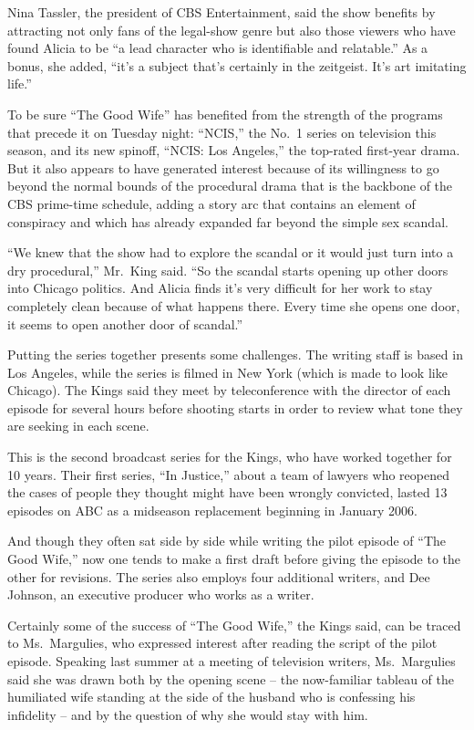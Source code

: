﻿\documentclass[12pt]{article}
\begin{document}
Nina Tassler, the president of CBS Entertainment, said the show benefits by attracting not only fans
of the legal-show genre but also those viewers who have found Alicia to be ``a lead character who is
identifiable and relatable.'' As a bonus, she added, ``it's a subject that's certainly in the
zeitgeist. It's art imitating life.''

To be sure ``The Good Wife'' has benefited from the strength of the programs that precede it on
Tuesday night: ``NCIS,'' the No.~1 series on television this season, and its new spinoff, ``NCIS:
Los Angeles,'' the top-rated first-year drama. But it also appears to have generated interest
because of its willingness to go beyond the normal bounds of the procedural drama that is the
backbone of the CBS prime-time schedule, adding a story arc that contains an element of
conspiracy\cite{conspiracy} and which has already expanded far beyond the simple sex scandal.

``We knew that the show had to explore the scandal or it would just turn into a dry procedural,''
Mr.~King said. ``So the scandal starts opening up other doors into Chicago politics. And Alicia
finds it's very difficult for her work to stay completely clean because of what happens there. Every
time she opens one door, it seems to open another door of scandal.''

Putting the series together presents some challenges. The writing staff is based in Los Angeles,
while the series is filmed in New York (which is made to look like Chicago). The Kings said they
meet by teleconference with the director of each episode for several hours before shooting starts in
order to review what tone they are seeking in each scene.

This is the second broadcast series for the Kings, who have worked together for 10 years. Their
first series, ``In Justice,'' about a team of lawyers who reopened the cases of people they thought
might have been wrongly convicted, lasted 13 episodes on ABC as a midseason replacement beginning in
January 2006.

And though they often sat side by side while writing the pilot episode of ``The Good Wife,'' now one
tends to make a first draft before giving the episode to the other for revisions. The series also
employs four additional writers, and Dee Johnson, an executive producer who works as a writer.

Certainly some of the success of ``The Good Wife,'' the Kings said, can be traced to Ms.~Margulies,
who expressed interest after reading the script of the pilot episode. Speaking last summer at a
meeting of television writers, Ms.~Margulies said she was drawn both by the opening scene -- the
now-familiar tableau of the humiliated wife standing at the side of the husband who is confessing
his infidelity -- and by the question of why she would stay with him.
\end{document}
